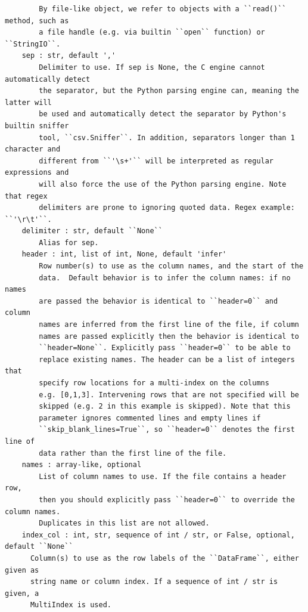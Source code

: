 \documentclass[
  letterpaper,
]{book}
\begin{document}
\begin{verbatim}
        By file-like object, we refer to objects with a ``read()`` method, such as
        a file handle (e.g. via builtin ``open`` function) or ``StringIO``.
    sep : str, default ','
        Delimiter to use. If sep is None, the C engine cannot automatically detect
        the separator, but the Python parsing engine can, meaning the latter will
        be used and automatically detect the separator by Python's builtin sniffer
        tool, ``csv.Sniffer``. In addition, separators longer than 1 character and
        different from ``'\s+'`` will be interpreted as regular expressions and
        will also force the use of the Python parsing engine. Note that regex
        delimiters are prone to ignoring quoted data. Regex example: ``'\r\t'``.
    delimiter : str, default ``None``
        Alias for sep.
    header : int, list of int, None, default 'infer'
        Row number(s) to use as the column names, and the start of the
        data.  Default behavior is to infer the column names: if no names
        are passed the behavior is identical to ``header=0`` and column
        names are inferred from the first line of the file, if column
        names are passed explicitly then the behavior is identical to
        ``header=None``. Explicitly pass ``header=0`` to be able to
        replace existing names. The header can be a list of integers that
        specify row locations for a multi-index on the columns
        e.g. [0,1,3]. Intervening rows that are not specified will be
        skipped (e.g. 2 in this example is skipped). Note that this
        parameter ignores commented lines and empty lines if
        ``skip_blank_lines=True``, so ``header=0`` denotes the first line of
        data rather than the first line of the file.
    names : array-like, optional
        List of column names to use. If the file contains a header row,
        then you should explicitly pass ``header=0`` to override the column names.
        Duplicates in this list are not allowed.
    index_col : int, str, sequence of int / str, or False, optional, default ``None``
      Column(s) to use as the row labels of the ``DataFrame``, either given as
      string name or column index. If a sequence of int / str is given, a
      MultiIndex is used.


\end{verbatim}
\end{document}
